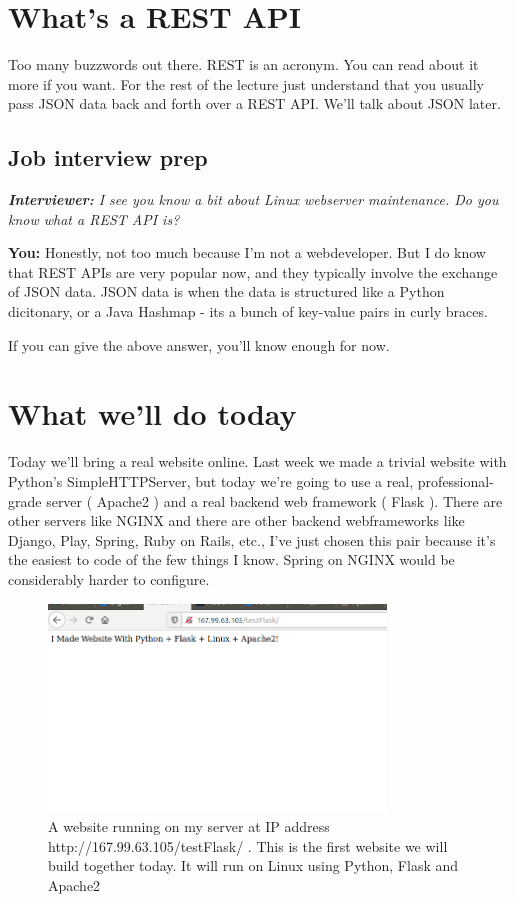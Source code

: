\documentclass[10pt]{article}
\begin{document}
\section{What's a REST API}
Too many buzzwords out there. REST is an acronym. You can read about it more if you want. For the rest of the lecture just understand that you usually pass JSON data back and forth over a REST API. We'll talk about JSON later.

\subsection{Job interview prep}
\noindent\textit{\textbf{Interviewer:} I see you know a bit about Linux webserver maintenance. Do you know what a REST API is?}

\noindent \textbf{You: } Honestly, not too much because I'm not a webdeveloper. But I do know that REST APIs are very popular now, and they typically involve the exchange of JSON data. JSON data is when the data is structured like a Python dicitonary, or a Java Hashmap  - its a bunch of key-value pairs in curly braces.

If you can give the above answer, you'll know enough for now.

\section{What we'll do today}
Today we'll bring a real website online. Last week we made a trivial website with Python's SimpleHTTPServer, but today we're going to use a real, professional-grade server ( Apache2 ) and a real backend web framework ( Flask ). There are other servers like NGINX and there are other backend webframeworks like Django, Play, Spring, Ruby on Rails, etc., I've just chosen this pair because it's the easiest to code of the few things I know. Spring on NGINX would be considerably harder to configure.

\begin{figure}[h]
  \centering
    \includegraphics[width=0.8\textwidth]{Exercise1Success.png}
  \caption{A website running on my server at IP address
http://167.99.63.105/testFlask/ . This is the first website we will build
together today. It will run on Linux using Python, Flask and Apache2}
\end{figure}
\end{document}
